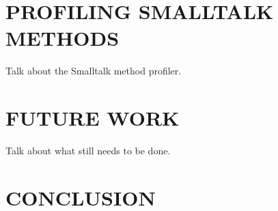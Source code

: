 \documentclass{sig-alternate}
\begin{document}
\section{PROFILING SMALLTALK METHODS}
Talk about the Smalltalk method profiler.

\section{FUTURE WORK}
Talk about what still needs to be done.

\section{CONCLUSION}
\end{document}
